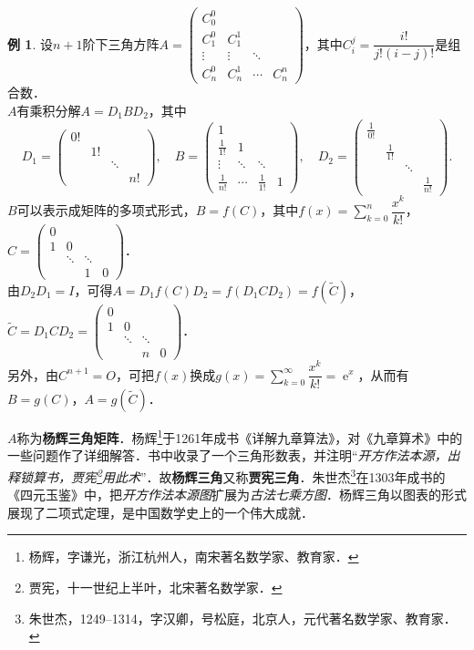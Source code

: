 \documentclass[a4paper,fontset=windows]{ctexbook}
\theoremstyle{definition}
\newtheorem{example}{例}[chapter]
\DeclareMathOperator{\E}{e}
\begin{document}
\begin{example}\label{ex2.9}
设$n+1$阶下三角方阵$A=\begin{pmatrix}C_0^0&&& \\ C_1^0&C_1^1&& \\ \vdots&\vdots&\ddots& \\ C_n^0&C_n^1&\cdots&C_n^n\end{pmatrix}$，其中$C_i^j=\dfrac{i!}{j!(i-j)!}$是组合数．\\
$A$有乘积分解$A=D_1BD_2$，其中
$$D_1=\begin{pmatrix}0!&&& \\ &1!&& \\ &&\ddots& \\ &&&n!\end{pmatrix},\quad B=\begin{pmatrix}1&&& \\ \frac{1}{1!}&1&& \\ \vdots&\ddots&\ddots& \\ \frac{1}{n!}&\cdots&\frac{1}{1!}&1\end{pmatrix},\quad D_2=\begin{pmatrix}\frac{1}{0!}&&& \\ &\frac{1}{1!}&& \\ &&\ddots& \\ &&&\frac{1}{n!}\end{pmatrix}.$$
$B$可以表示成矩阵的多项式形式，$B=f(C)$，其中$f(x)=\sum\limits_{k=0}^n\dfrac{x^k}{k!}$，$C=\begin{pmatrix}0&&& \\ 1&0&& \\ &\ddots&\ddots& \\ &&1&0\end{pmatrix}$．\\
由$D_2D_1=I$，可得$A=D_1f(C)D_2=f(D_1CD_2)=f(\widetilde{C})$，$\widetilde{C}=D_1CD_2=\begin{pmatrix}0&&& \\ 1&0&& \\ &\ddots&\ddots& \\ &&n&0\end{pmatrix}$．\\
另外，由$C^{n+1}=O$，可把$f(x)$换成$g(x)=\sum\limits_{k=0}^{\infty}\dfrac{x^k}{k!}=\E^x$，从而有$B=g(C)$，$A=g(\widetilde{C})$．

$A$称为{\bf 杨辉三角矩阵}．杨辉\footnote{杨辉，字谦光，浙江杭州人，南宋著名数学家、教育家．}于1261年成书《详解九章算法》，对《九章算术》中的一些问题作了详细解答．书中收录了一个三角形数表，并注明“{\em 开方作法本源，出释锁算书，贾宪\footnote{贾宪，十一世纪上半叶，北宋著名数学家．}用此术}”．故{\bf 杨辉三角}又称{\bf 贾宪三角}．朱世杰\footnote{朱世杰，1249--1314，字汉卿，号松庭，北京人，元代著名数学家、教育家．}在1303年成书的《四元玉鉴》中，把{\em 开方作法本源图}扩展为{\em 古法七乘方图}．杨辉三角以图表的形式展现了二项式定理，是中国数学史上的一个伟大成就．
\end{example}
\end{document}
